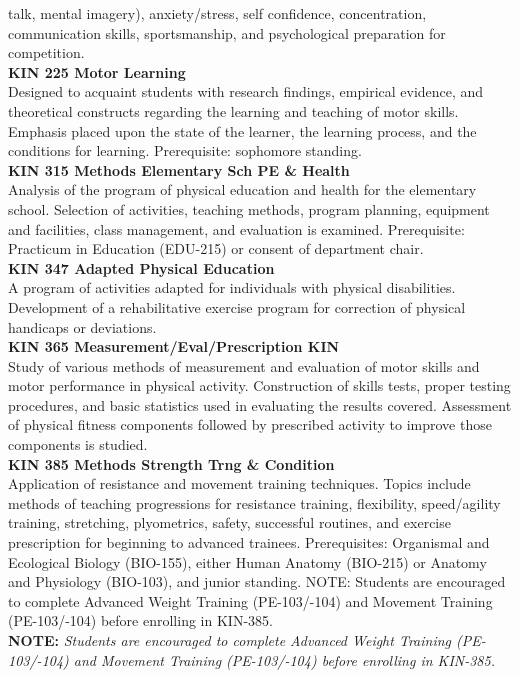 \documentclass[
  letterpaper,
]{scrbook}
\begin{document}
talk, mental imagery), anxiety/stress, self confidence, concentration,
communication skills, sportsmanship, and psychological preparation for
competition.\\
\textbf{KIN 225 Motor Learning}\\
Designed to acquaint students with research findings, empirical
evidence, and theoretical constructs regarding the learning and teaching
of motor skills. Emphasis placed upon the state of the learner, the
learning process, and the conditions for learning. Prerequisite:
sophomore standing.\\
\textbf{KIN 315 Methods Elementary Sch PE \& Health}\\
Analysis of the program of physical education and health for the
elementary school. Selection of activities, teaching methods, program
planning, equipment and facilities, class management, and evaluation is
examined. Prerequisite: Practicum in Education (EDU-215) or consent of
department chair.\\
\textbf{KIN 347 Adapted Physical Education}\\
A program of activities adapted for individuals with physical
disabilities. Development of a rehabilitative exercise program for
correction of physical handicaps or deviations.\\
\textbf{KIN 365 Measurement/Eval/Prescription KIN}\\
Study of various methods of measurement and evaluation of motor skills
and motor performance in physical activity. Construction of skills
tests, proper testing procedures, and basic statistics used in
evaluating the results covered. Assessment of physical fitness
components followed by prescribed activity to improve those components
is studied.\\
\textbf{KIN 385 Methods Strength Trng \& Condition}\\
Application of resistance and movement training techniques. Topics
include methods of teaching progressions for resistance training,
flexibility, speed/agility training, stretching, plyometrics, safety,
successful routines, and exercise prescription for beginning to advanced
trainees. Prerequisites: Organismal and Ecological Biology (BIO-155),
either Human Anatomy (BIO-215) or Anatomy and Physiology (BIO-103), and
junior standing. NOTE: Students are encouraged to complete Advanced
Weight Training (PE-103/-104) and Movement Training (PE-103/-104) before
enrolling in KIN-385.\\
\textbf{NOTE:} \emph{Students are encouraged to complete Advanced Weight
Training (PE-103/-104) and Movement Training (PE-103/-104) before
enrolling in KIN-385.}\\
\end{document}
